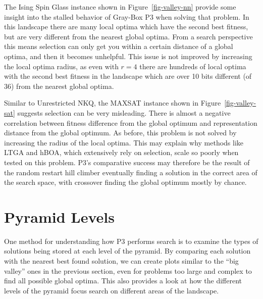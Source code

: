 The Ising Spin Glass instance shown in Figure~\ref{fig-valley-nn} provide some insight into the stalled behavior of Gray-Box
P3 when solving that problem. In this landscape there are many local optima which have the second best fitness, but are very
different from the nearest global optima. From a search perspective this means selection can only get you within a certain distance
of a global optima, and then it becomes unhelpful. This issue is not improved by increasing the local optima radius, as even with
$r=4$ there are hundreds of local optima with the second best fitness in the landscape which are over 10 bits different (of 36) from
the nearest global optima.

\begin{figure*}
  \centering
  \caption{Location and quality of local optima in comparison to the global optima for a representative MAX-SAT problem
           with $N=36$.}
  \label{fig-valley-sat}
\end{figure*}

Similar to Unrestricted NKQ, the MAXSAT instance shown in Figure~\ref{fig-valley-sat} suggests selection can be very misleading.
There is almost a negative correlation between fitness difference from the global optimum and representation distance from the
global optimum. As before, this problem is not solved by increasing the radius of the local optima.
This may explain why methods like LTGA and hBOA, which extensively rely on selection,
scale so poorly when tested on this problem. P3's comparative success may therefore be the result of the random restart hill climber
eventually finding a solution in the correct area of the search space, with crossover finding the global optimum mostly by chance.

\section{Pyramid Levels}
One method for understanding how P3 performs search is to examine the types of solutions being stored at each level
of the pyramid. By comparing each solution with the nearest best found solution, we can create plots similar to the ``big valley''
ones in the previous section, even for problems too large and complex to find all possible global optima. 
This also provides a look at how the different levels of the pyramid focus search on different areas of the landscape.

\begin{figure*}
  \centering
  \caption{Distribution of local optima stored at each level of Gray-Box P3 in relation to the global optimum on
           the Deceptive Step Trap problem $N=6000$ and traps of size 5.}
  \label{fig-level-dst}
\end{figure*}

